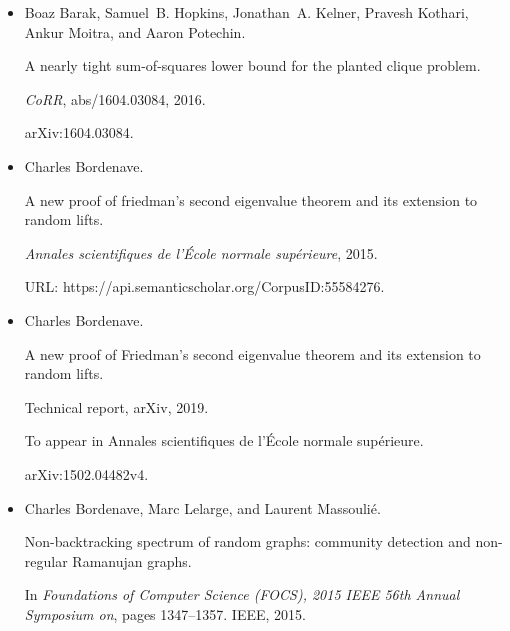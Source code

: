 \begin{itemize}
A Nearly Tight Sum-of-Squares Lower Bound for the Planted Clique
Problem.


\emph{SIAM Journal on Computing}, 48(2):687–735, 2019.


doi:10.1137/17M1138236.





\item[] 
[6]

Boaz Barak, Samuel B. Hopkins, Jonathan A. Kelner, Pravesh Kothari, Ankur
Moitra, and Aaron Potechin.


A nearly tight sum-of-squares lower bound for the planted clique
problem.


\emph{CoRR}, abs/1604.03084, 2016.


arXiv:1604.03084.





\item[] 
[7]

Charles Bordenave.


A new proof of friedman’s second eigenvalue theorem and its extension
to random lifts.


\emph{Annales scientifiques de l’École normale supérieure},
2015.


URL: https://api.semanticscholar.org/CorpusID:55584276.





\item[] 
[8]

Charles Bordenave.


A new proof of Friedman’s second eigenvalue theorem and its
extension to random lifts.


Technical report, arXiv, 2019.


To appear in Annales scientifiques de l’École normale
supérieure.


arXiv:1502.04482v4.





\item[] 
[9]

Charles Bordenave, Marc Lelarge, and Laurent Massoulié.


Non-backtracking spectrum of random graphs: community detection and
non-regular Ramanujan graphs.


In \emph{Foundations of Computer Science (FOCS), 2015 IEEE 56th Annual
Symposium on}, pages 1347–1357. IEEE, 2015.



\end{itemize}
